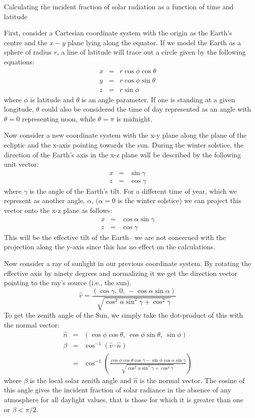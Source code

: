 \documentclass[11pt]{article}
\begin{document}
{\LARGE Calculating the incident fraction of solar radiation as a function of time and latitude}

First, consider a Cartesian coordinate system with the origin as the Earth's
centre and the $x-y$ plane lying along the equator.  If we model the Earth
as a sphere of radius $r$, a line of latitude will trace out a circle
given by the following equations:
\begin{eqnarray}
x & = & r \cos \phi \cos \theta \\
y & = & r \cos \phi \sin \theta \\
z & = & r \sin \phi
\end{eqnarray}
where $\phi$ is latitude and $\theta$ is an angle parameter.  If one is
standing at a given longitude, $\theta$ could also be considered the time
of day represented as an angle with $\theta=0$ representing noon, while
$\theta=\pi$ is midnight.

Now consider a new coordinate system with the x-y plane along the plane
of the ecliptic and the x-axis pointing towards the sun.  During the
winter solstice, the direction of the Earth's axis in the 
x-z plane will be described
by the following unit vector:
\begin{eqnarray}
x & = & \sin \gamma \\
z & = & \cos \gamma
\end{eqnarray}
where $\gamma$ is the angle of the Earth's tilt.
For a different time of year, which we represent as another angle, 
$\alpha$, ($\alpha=0$ is the winter solstice) 
we can project this vector onto the x-z plane as follows:
\begin{eqnarray}
x & = & \cos \alpha \sin \gamma \\
z & = & \cos \gamma
\end{eqnarray}
This will be the effective tilt of the Earth--
we are not concerned with the projection along the y-axis since this
has no effect on the calculations.

Now consider a ray of sunlight in our previous coordinate system.
By rotating the effective axis by ninety degrees and normalizing it
we get the direction vector pointing to the ray's source (i.e., the sun).
\begin{equation}
\hat v = \frac{(\cos \gamma, ~ 0, ~ -\cos \alpha \sin \alpha)}
		{\sqrt{\cos^2 \alpha \sin^2 \gamma + \cos^2 \gamma}}
\end{equation}
To get the zenith angle of the Sun, we simply take the dot-product
of this with the normal vector:
\begin{eqnarray}
\hat n & = & (\cos \phi \cos \theta, ~ \cos \phi \sin \theta, ~ \sin \phi) \\
\beta & = & \cos^{-1} (\hat v \cdot \hat n) \\
& = & \cos^{-1}\left ( \frac{\cos \phi \cos \theta \cos \gamma -
	\sin \phi \cos \alpha \sin \gamma} 
	{\sqrt{\cos^2 \alpha \sin^2 \gamma + \cos^2 \gamma}} \right )
\end{eqnarray}
where $\beta$ is the local solar zenith angle and $\hat n$ is the normal vector.  
The cosine of this angle
gives the incident fraction of
solar radiance in the absence of any atmosphere for all daylight
values, that is those for which it is greater than one or $\beta < \pi/2$.
\end{document}

